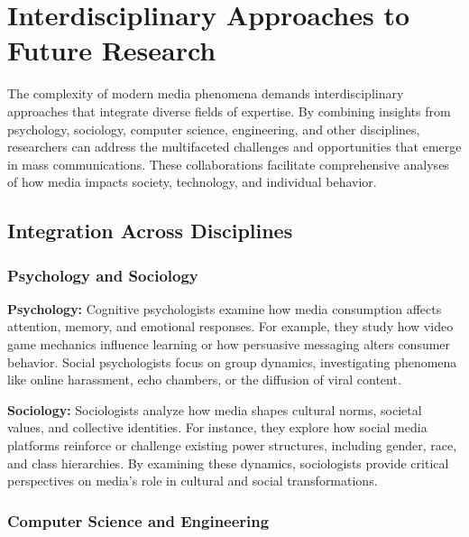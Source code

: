 \documentclass[
]{book}
\begin{document}
\section{Interdisciplinary Approaches to Future Research}\label{interdisciplinary-approaches-to-future-research}

The complexity of modern media phenomena demands interdisciplinary approaches that integrate diverse fields of expertise. By combining insights from psychology, sociology, computer science, engineering, and other disciplines, researchers can address the multifaceted challenges and opportunities that emerge in mass communications. These collaborations facilitate comprehensive analyses of how media impacts society, technology, and individual behavior.

\subsection*{Integration Across Disciplines}\label{integration-across-disciplines}

\subsubsection*{Psychology and Sociology}\label{psychology-and-sociology}

\textbf{Psychology:} Cognitive psychologists examine how media consumption affects attention, memory, and emotional responses. For example, they study how video game mechanics influence learning or how persuasive messaging alters consumer behavior. Social psychologists focus on group dynamics, investigating phenomena like online harassment, echo chambers, or the diffusion of viral content.

\textbf{Sociology:} Sociologists analyze how media shapes cultural norms, societal values, and collective identities. For instance, they explore how social media platforms reinforce or challenge existing power structures, including gender, race, and class hierarchies. By examining these dynamics, sociologists provide critical perspectives on media's role in cultural and social transformations.

\subsubsection*{Computer Science and Engineering}\label{computer-science-and-engineering}
\end{document}

